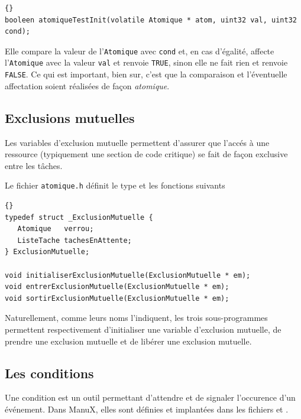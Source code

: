 \begin{lstlisting}{}
booleen atomiqueTestInit(volatile Atomique * atom, uint32 val, uint32 cond);
\end{lstlisting}

   Elle compare la valeur de l'\lstinline!Atomique! avec
\lstinline!cond! et, en cas d'égalité, affecte l'\lstinline!Atomique!
avec la valeur \lstinline!val! et renvoie \lstinline!TRUE!, sinon elle 
ne fait rien et renvoie \lstinline!FALSE!. Ce qui est important, bien
sur, c'est que la comparaison et l'éventuelle affectation soient
réalisées de façon {\em atomique}.

\subsection{Exclusions mutuelles}

   Les variables d'exclusion mutuelle permettent d'assurer que l'accés
à une ressource (typiquement une section de code critique) se fait de
façon exclusive entre les tâches.

   Le fichier {\tt atomique.h} définit le type et les fonctions
suivants 

\begin{lstlisting}{}
typedef struct _ExclusionMutuelle {
   Atomique   verrou;
   ListeTache tachesEnAttente;
} ExclusionMutuelle;

void initialiserExclusionMutuelle(ExclusionMutuelle * em);
void entrerExclusionMutuelle(ExclusionMutuelle * em);
void sortirExclusionMutuelle(ExclusionMutuelle * em);
\end{lstlisting}

   Naturellement, comme leurs noms l'indiquent, les trois
sous-programmes permettent respectivement d'initialiser une variable
d'exclusion mutuelle, de prendre une exclusion mutuelle et de libérer
une exclusion mutuelle.

\subsection{Les conditions}

   Une condition est un outil permettant d'attendre et de signaler
l'occurence d'un événement. Dans ManuX, elles sont définies et
implantées dans les fichiers  et
.

